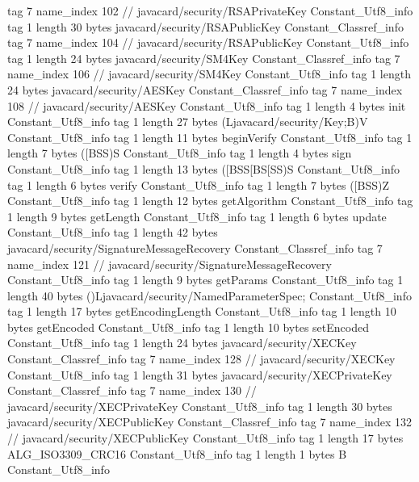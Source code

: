 {{{			tag	7
			name_index	102		// javacard/security/RSAPrivateKey
		}
		Constant_Utf8_info {
			tag	1
			length	30
			bytes	javacard/security/RSAPublicKey
		}
		Constant_Classref_info {
			tag	7
			name_index	104		// javacard/security/RSAPublicKey
		}
		Constant_Utf8_info {
			tag	1
			length	24
			bytes	javacard/security/SM4Key
		}
		Constant_Classref_info {
			tag	7
			name_index	106		// javacard/security/SM4Key
		}
		Constant_Utf8_info {
			tag	1
			length	24
			bytes	javacard/security/AESKey
		}
		Constant_Classref_info {
			tag	7
			name_index	108		// javacard/security/AESKey
		}
		Constant_Utf8_info {
			tag	1
			length	4
			bytes	init
		}
		Constant_Utf8_info {
			tag	1
			length	27
			bytes	(Ljavacard/security/Key;B)V
		}
		Constant_Utf8_info {
			tag	1
			length	11
			bytes	beginVerify
		}
		Constant_Utf8_info {
			tag	1
			length	7
			bytes	([BSS)S
		}
		Constant_Utf8_info {
			tag	1
			length	4
			bytes	sign
		}
		Constant_Utf8_info {
			tag	1
			length	13
			bytes	([BSS[BS[SS)S
		}
		Constant_Utf8_info {
			tag	1
			length	6
			bytes	verify
		}
		Constant_Utf8_info {
			tag	1
			length	7
			bytes	([BSS)Z
		}
		Constant_Utf8_info {
			tag	1
			length	12
			bytes	getAlgorithm
		}
		Constant_Utf8_info {
			tag	1
			length	9
			bytes	getLength
		}
		Constant_Utf8_info {
			tag	1
			length	6
			bytes	update
		}
		Constant_Utf8_info {
			tag	1
			length	42
			bytes	javacard/security/SignatureMessageRecovery
		}
		Constant_Classref_info {
			tag	7
			name_index	121		// javacard/security/SignatureMessageRecovery
		}
		Constant_Utf8_info {
			tag	1
			length	9
			bytes	getParams
		}
		Constant_Utf8_info {
			tag	1
			length	40
			bytes	()Ljavacard/security/NamedParameterSpec;
		}
		Constant_Utf8_info {
			tag	1
			length	17
			bytes	getEncodingLength
		}
		Constant_Utf8_info {
			tag	1
			length	10
			bytes	getEncoded
		}
		Constant_Utf8_info {
			tag	1
			length	10
			bytes	setEncoded
		}
		Constant_Utf8_info {
			tag	1
			length	24
			bytes	javacard/security/XECKey
		}
		Constant_Classref_info {
			tag	7
			name_index	128		// javacard/security/XECKey
		}
		Constant_Utf8_info {
			tag	1
			length	31
			bytes	javacard/security/XECPrivateKey
		}
		Constant_Classref_info {
			tag	7
			name_index	130		// javacard/security/XECPrivateKey
		}
		Constant_Utf8_info {
			tag	1
			length	30
			bytes	javacard/security/XECPublicKey
		}
		Constant_Classref_info {
			tag	7
			name_index	132		// javacard/security/XECPublicKey
		}
		Constant_Utf8_info {
			tag	1
			length	17
			bytes	ALG_ISO3309_CRC16
		}
		Constant_Utf8_info {
			tag	1
			length	1
			bytes	B
		}
		Constant_Utf8_info {
}}}
